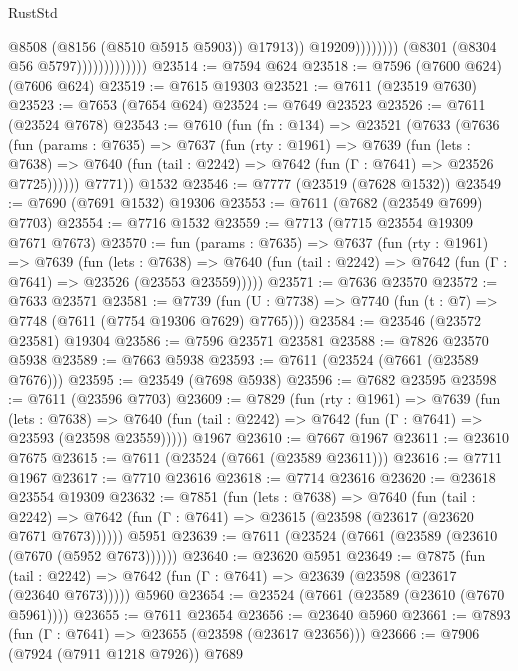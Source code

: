 \begin{lexlean}{RustStd}
\begin{coremodule}
                                              @8508
                                              (@8156 (@8510 @5915 @5903))
                                              @17913))
                                          @19209))))))))
                          (@8301 (@8304 @56 @5797)))))))))))))
@23514 := @7594 @624
@23518 := @7596 (@7600 @624) (@7606 @624)
@23519 := @7615 @19303
@23521 := @7611 (@23519 @7630)
@23523 := @7653 (@7654 @624)
@23524 := @7649 @23523
@23526 := @7611 (@23524 @7678)
@23543 := @7610
    (fun (fn : @134) =>
    @23521
      (@7633
        (@7636
          (fun (params : @7635) =>
          @7637
            (fun (rty : @1961) =>
            @7639
              (fun (lets : @7638) =>
              @7640 (fun (tail : @2242) => @7642 (fun (Γ : @7641) => @23526 @7725))))))
        @7771))
    @1532
@23546 := @7777 (@23519 (@7628 @1532))
@23549 := @7690 (@7691 @1532) @19306
@23553 := @7611 (@7682 (@23549 @7699) @7703)
@23554 := @7716 @1532
@23559 := @7713 (@7715 @23554 @19309 @7671 @7673)
@23570 := fun (params : @7635) =>
  @7637
    (fun (rty : @1961) =>
    @7639
      (fun (lets : @7638) =>
      @7640 (fun (tail : @2242) => @7642 (fun (Γ : @7641) => @23526 (@23553 @23559)))))
@23571 := @7636 @23570
@23572 := @7633 @23571
@23581 := @7739
    (fun (U : @7738) => @7740 (fun (t : @7) => @7748 (@7611 (@7754 @19306 @7629) @7765)))
@23584 := @23546 (@23572 @23581) @19304
@23586 := @7596 @23571 @23581
@23588 := @7826 @23570 @5938
@23589 := @7663 @5938
@23593 := @7611 (@23524 (@7661 (@23589 @7676)))
@23595 := @23549 (@7698 @5938)
@23596 := @7682 @23595
@23598 := @7611 (@23596 @7703)
@23609 := @7829
    (fun (rty : @1961) =>
    @7639
      (fun (lets : @7638) =>
      @7640 (fun (tail : @2242) => @7642 (fun (Γ : @7641) => @23593 (@23598 @23559)))))
    @1967
@23610 := @7667 @1967
@23611 := @23610 @7675
@23615 := @7611 (@23524 (@7661 (@23589 @23611)))
@23616 := @7711 @1967
@23617 := @7710 @23616
@23618 := @7714 @23616
@23620 := @23618 @23554 @19309
@23632 := @7851
    (fun (lets : @7638) =>
    @7640
      (fun (tail : @2242) =>
      @7642 (fun (Γ : @7641) => @23615 (@23598 (@23617 (@23620 @7671 @7673))))))
    @5951
@23639 := @7611 (@23524 (@7661 (@23589 (@23610 (@7670 (@5952 @7673))))))
@23640 := @23620 @5951
@23649 := @7875
    (fun (tail : @2242) => @7642 (fun (Γ : @7641) => @23639 (@23598 (@23617 (@23640 @7673)))))
    @5960
@23654 := @23524 (@7661 (@23589 (@23610 (@7670 @5961))))
@23655 := @7611 @23654
@23656 := @23640 @5960
@23661 := @7893 (fun (Γ : @7641) => @23655 (@23598 (@23617 @23656)))
@23666 := @7906 (@7924 (@7911 @1218 @7926)) @7689

\end{coremodule}
\end{lexlean}
